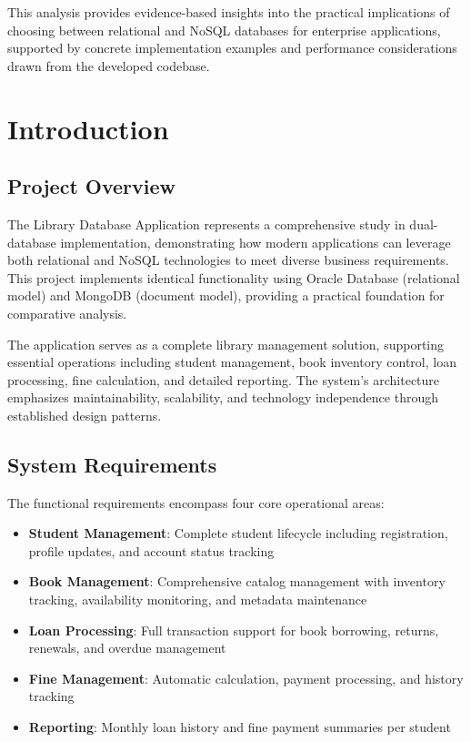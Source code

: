 \documentclass[12pt,a4paper]{article}
\begin{document}
This analysis provides evidence-based insights into the practical implications of choosing between relational and NoSQL databases for enterprise applications, supported by concrete implementation examples and performance considerations drawn from the developed codebase.

\section{Introduction}

\subsection{Project Overview}

The Library Database Application represents a comprehensive study in dual-database implementation, demonstrating how modern applications can leverage both relational and NoSQL technologies to meet diverse business requirements. This project implements identical functionality using Oracle Database (relational model) and MongoDB (document model), providing a practical foundation for comparative analysis.

The application serves as a complete library management solution, supporting essential operations including student management, book inventory control, loan processing, fine calculation, and detailed reporting. The system's architecture emphasizes maintainability, scalability, and technology independence through established design patterns.

\subsection{System Requirements}

The functional requirements encompass four core operational areas:

\begin{itemize}
    \item \textbf{Student Management}: Complete student lifecycle including registration, profile updates, and account status tracking
    \item \textbf{Book Management}: Comprehensive catalog management with inventory tracking, availability monitoring, and metadata maintenance
    \item \textbf{Loan Processing}: Full transaction support for book borrowing, returns, renewals, and overdue management
    \item \textbf{Fine Management}: Automatic calculation, payment processing, and history tracking
    \item \textbf{Reporting}: Monthly loan history and fine payment summaries per student
\end{itemize}
\end{document}
